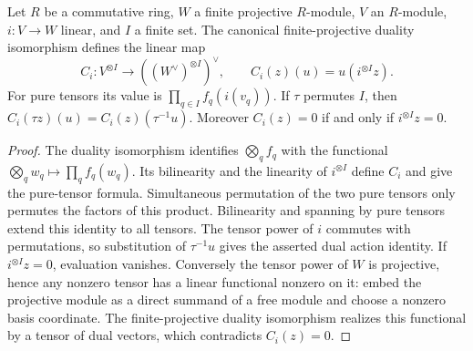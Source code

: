 \begin{lemma}
\label{lem:projective-tensor-evaluation}
\leanok
Let $R$ be a commutative ring, $W$ a finite projective $R$-module,
$V$ an $R$-module, $i:V\to W$ linear, and $I$ a finite set.
The canonical finite-projective duality isomorphism defines the linear map
\[
 C_i:V^{\otimes I}\longrightarrow ((W^\vee)^{\otimes I})^\vee,
 \qquad C_i(z)(u)=u(i^{\otimes I}z).
\]
For pure tensors its value is $\prod_{q\in I}f_q(i(v_q))$.
If $\tau$ permutes $I$, then
$C_i(\tau z)(u)=C_i(z)(\tau^{-1}u)$.
Moreover $C_i(z)=0$ if and only if $i^{\otimes I}z=0$.
\end{lemma}
\begin{proof}
The duality isomorphism identifies $\bigotimes_q f_q$ with the functional
$\bigotimes_q w_q\mapsto\prod_q f_q(w_q)$. Its bilinearity and the
linearity of $i^{\otimes I}$ define $C_i$ and give the pure-tensor formula.
Simultaneous permutation of the two pure tensors only permutes the factors
of this product. Bilinearity and spanning by pure tensors extend this
identity to all tensors. The tensor power of $i$ commutes with permutations,
so substitution of $\tau^{-1}u$ gives the asserted dual action identity.
If $i^{\otimes I}z=0$, evaluation vanishes. Conversely the tensor power
of $W$ is projective, hence any nonzero tensor has a linear functional
nonzero on it: embed the projective module as a direct summand of a free
module and choose a nonzero basis coordinate. The finite-projective
duality isomorphism realizes this functional by a tensor of dual vectors,
which contradicts $C_i(z)=0$.
\end{proof}

